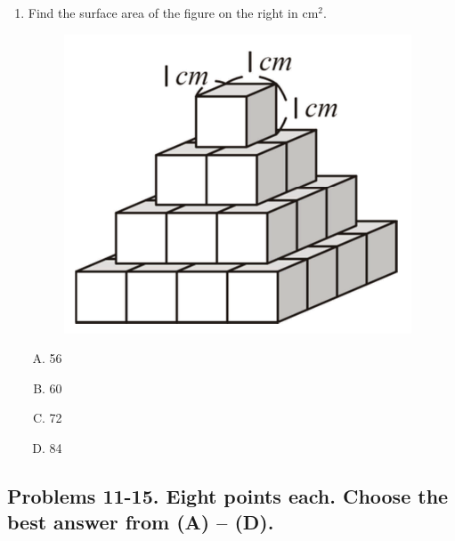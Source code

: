 \documentclass[12pt]{scrartcl}
\begin{document}
\begin{enumerate}
\item Find the surface area of the figure on the right in cm$^2$.
\begin{figure}[h]
    \centering
    \includegraphics{StarGen/0Figure/wmi-2020-6a-pyramid-of-cubes.png}
\end{figure}
\begin{enumerate}[(A)]
    \item 56 \item 60 \item 72 \item 84
\end{enumerate}
\end{enumerate}

\subsection*{Problems 11-15. Eight points each. Choose the best answer from (A) -- (D).}
\end{document}
